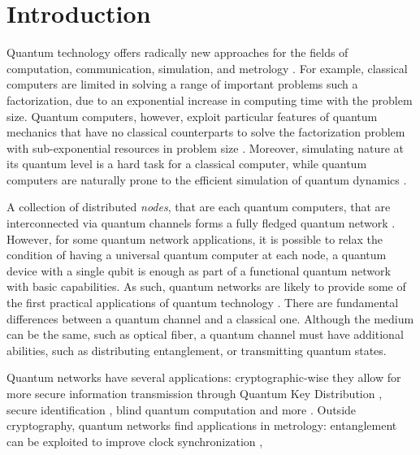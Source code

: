 \documentclass[english, a4paper, 12pt, twoside]{book}
\numberwithin{equation}{section} %
\begin{document}
\newpage
\tableofcontents


\newpage
{} %
\setcounter{page}{1} %


\chapter{Introduction} %
Quantum technology offers radically new approaches for the fields of computation, communication, simulation, and metrology \cite{quantumtech}. For example, classical computers are limited in solving a range of important problems such a factorization, due to an exponential increase in computing time with the problem size. Quantum computers, however, exploit particular features of quantum mechanics that have no classical counterparts to solve the factorization problem with sub-exponential resources in problem size \cite{shor}. Moreover, simulating nature at its quantum level is a hard task for a classical computer, while quantum computers are naturally prone to the efficient simulation of quantum dynamics \cite{RevModPhys.86.153}.\par
A collection of distributed \emph{nodes}, that are each quantum computers, that are interconnected via quantum channels forms a fully fledged quantum network \cite{kimble}. However, for some quantum network applications, it is possible to relax the condition of having a universal quantum computer at each node, a quantum device with a single qubit is enough as part of a functional quantum network with basic capabilities. As such, quantum networks are likely to provide some of the first practical applications of quantum technology \cite{Wehnereaam9288}. There are fundamental differences between a quantum channel and a classical one. Although the medium can be the same, such as optical fiber, a quantum channel must have additional abilities, such as distributing entanglement, or transmitting quantum states.\par
Quantum networks have several applications: cryptographic-wise they allow for more secure information transmission through Quantum Key Distribution \cite{qkd2}, secure identification \cite{secureident}, blind quantum computation \cite{blindcomputation} and more \cite{Wehnereaam9288}. Outside cryptography, quantum networks find applications in metrology: entanglement can be exploited to improve clock synchronization \cite{quantumclocks},
\end{document}
